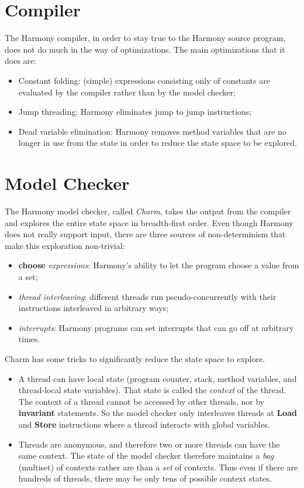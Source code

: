 \documentclass{report}
\begin{document}
\section{Compiler}

The Harmony compiler, in order to stay true to the Harmony source program,
does not do much in the way of optimizations.  The main optimizations that
it does are:

\begin{itemize}
\item Constant folding: (simple) expressions consisting only of constants
are evaluated by the compiler rather than by the model checker;
\item Jump threading: Harmony eliminates jump to jump instructions;
\item Dead variable elimination: Harmony removes method variables that
are no longer in use from the state in order to reduce the state space
to be explored.
\end{itemize}

\section{Model Checker}

The Harmony model checker, called \emph{Charm}, takes the output from
the compiler and explores the entire state space in breadth-first order.
Even though Harmony does not really support input, there are three sources of
non-determinism that make this exploration non-trivial:

\begin{itemize}
\item \textbf{choose} \emph{expressions}: Harmony's ability to let the program
choose a value from a set;
\item \emph{thread interleaving}: different threads run pseudo-concurrently
with their instructions interleaved in arbitrary ways;
\item \emph{interrupts}: Harmony programs can set interrupts that can go
off at arbitrary times.
\end{itemize}

Charm has some tricks to significantly reduce the state space to explore.
\begin{itemize}
\item A thread can have local state (program counter, stack,
method variables, and thread-local state variables).
That state is called the \emph{context} of the thread.
The context of a thread cannot be accessed by other
threads, nor by \textbf{invariant} statements.
So the model checker only interleaves threads at \textbf{Load} and
\textbf{Store} instructions where a thread interacts with global
variables.
\item Threads are anonymous, and therefore two or more threads can
have the same context.  The state of the model checker therefore maintains
a \emph{bag} (multiset) of contexts rather are than a \emph{set} of contexts.
Thus even if there are hundreds of threads, there may be only tens of
possible context states.
\end{itemize}
\end{document}
